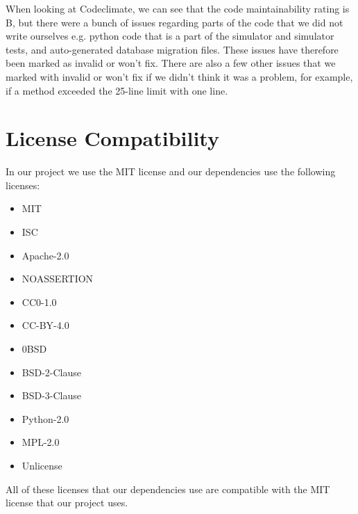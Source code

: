 \noindent When looking at Codeclimate, we can see that the code maintainability rating is B, but there were a bunch of issues regarding parts of the code that we did not write ourselves e.g. python code that is a part of the simulator and simulator tests, and auto-generated database migration files. These issues have therefore been marked as invalid or won't fix. There are also a few other issues that we marked with invalid or won't fix if we didn't think it was a problem, for example, if a method exceeded the 25-line limit with one line.

\section{License Compatibility}
In our project we use the MIT license and our dependencies use the following licenses:
\begin{itemize}
    \item MIT
    \item ISC
    \item Apache-2.0
    \item NOASSERTION
    \item CC0-1.0
    \item CC-BY-4.0
    \item 0BSD
    \item BSD-2-Clause
    \item BSD-3-Clause
    \item Python-2.0
    \item MPL-2.0
    \item Unlicense
\end{itemize}

All of these licenses that our dependencies use are compatible with the MIT license that our project uses.